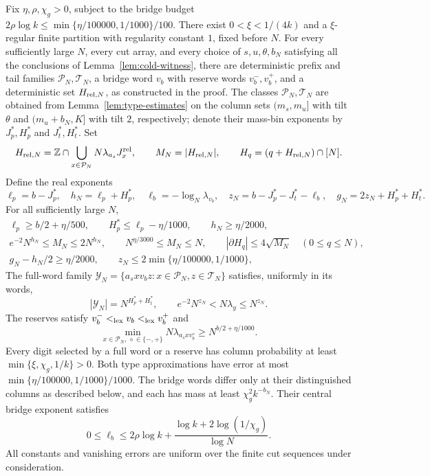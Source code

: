 \begin{lemma}
\label{lem:cold-geometry}
Fix $\eta,\rho,\chi_g>0$, subject to the
bridge budget $2\rho\log k\le\min\{\eta/100000,1/1000\}/100$. There exist $0<\xi<1/(4k)$ and a $\xi$-regular finite partition with regularity constant $1$, fixed before $N$. For every sufficiently large $N$, every cut array, and every choice of $s,u,\theta,b_N$ satisfying all the conclusions of Lemma~\ref{lem:cold-witness}, there are deterministic prefix
and tail families $\mathcal P_N,\mathcal T_N$, a bridge word $v_b$ with
reserve words $v_b^-,v_b^+$, and a deterministic set $H_{{\rm rel},N}$,
as constructed in the proof. The classes $\mathcal P_N,\mathcal T_N$
are obtained from Lemma~\ref{lem:type-estimates} on the column sets
$(m_s,m_u]$ with tilt $\theta$ and $(m_u+b_N,K]$ with tilt $2$,
respectively; denote their mass-bin exponents by $J_p^*,H_p^*$ and
$J_t^*,H_t^*$. Set
\[
 H_{{\rm rel},N}=\mathbb Z\cap
    \bigcup_{x\in\mathcal P_N}N\lambda_{a_s}J_x^{\rm rel},\qquad
 M_N=|H_{{\rm rel},N}|,\qquad H_q=(q+H_{{\rm rel},N})\cap[N].
\]
Define the real exponents
\[
 \ell_p=b-J_p^*,\quad h_N=\ell_p+H_p^*,\quad
 \ell_b=-\log_N\lambda_{v_b},\quad
 z_N=b-J_p^*-J_t^*-\ell_b,\quad
 g_N=2z_N+H_p^*+H_t^*.
\]
For all sufficiently large $N$,
\begin{gather}
 \ell_p\ge b/2+\eta/500,\qquad H_p^*\le\ell_p-\eta/1000,\qquad
 h_N\ge\eta/2000,\label{eq:cold-effective-geometry}\\
 e^{-2}N^{h_N}\le M_N\le2N^{h_N},\qquad
 N^{\eta/3000}\le M_N\le N,\qquad
 |\partial H_q|\le4\sqrt{M_N}\quad(0\le q\le N),
 \label{eq:cold-geometric-conclusions}\\
 g_N-h_N/2\ge\eta/2000,\qquad z_N\le2\min\{\eta/100000,1/1000\},
 \label{eq:cold-effective-collision}
\end{gather}
The full-word family $\mathcal Y_N=\{a_sxv_bz:x\in\mathcal P_N,z\in\mathcal T_N\}$
satisfies, uniformly in its words,
\begin{equation}
\label{eq:cold-full-word-masses}
 |\mathcal Y_N|=N^{H_p^*+H_t^*},\qquad
 e^{-2}N^{z_N}<N\lambda_y\le N^{z_N}.
\end{equation}
The reserves satisfy $v_b^-<_{\rm lex}v_b<_{\rm lex}v_b^+$ and
\begin{equation}
\label{eq:cold-reserve-means}
 \min_{x\in\mathcal P_N,\,\diamond\in\{-,+\}}
       N\lambda_{a_sxv_b^\diamond}\ge N^{b/2+\eta/1000}.
\end{equation}
Every digit selected by a full word or a reserve has column probability
at least $\min\{\xi,\chi_g,1/k\}>0$. Both type approximations have error at most $\min\{\eta/100000,1/1000\}/1000$. The bridge words differ only at their distinguished columns as described below, and each has mass at least $\chi_g^2k^{-b_N}$. Their central bridge exponent satisfies
\[
 0\le\ell_b\le2\rho\log k+
 \frac{\log k+2\log(1/\chi_g)}{\log N}.
\]
All constants and vanishing errors are uniform
over the finite cut sequences under consideration.
\end{lemma}

